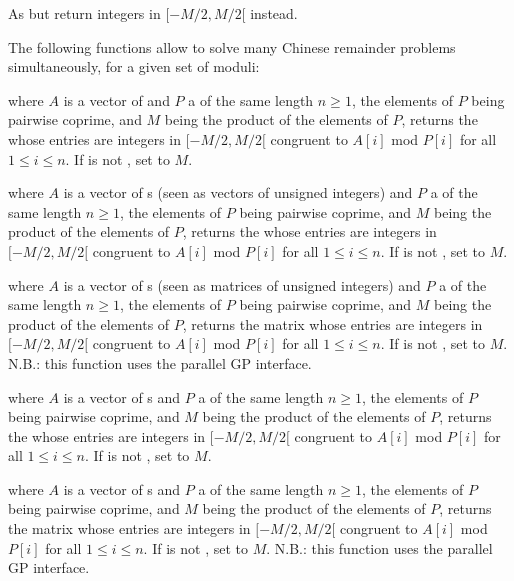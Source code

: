As  but return integers in $[-M/2, M/2[$ instead.

The following functions allow to solve many Chinese remainder problems
simultaneously, for a given set of moduli:

where $A$ is a vector of 
and $P$ a  of the same length $n\ge 1$, the elements of $P$
being pairwise coprime, and $M$ being the product of the elements of $P$,
returns the  whose entries are integers in $[-M/2, M/2[$ congruent to $A[i]$
mod $P[i]$ for all $1\leq i\leq n$.
If  is not , set  to $M$.

 where $A$ is a
vector of s (seen as vectors of unsigned integers) and $P$ a
 of the same length $n\ge 1$, the elements of $P$ being
pairwise coprime, and $M$ being the product of the elements of $P$, returns
the  whose entries are integers in $[-M/2, M/2[$ congruent to $A[i]$
mod $P[i]$ for all $1\leq i\leq n$. If  is not , set
 to $M$.

 where $A$ is a
vector of s (seen as matrices of unsigned integers) and $P$ a
 of the same length $n\ge 1$, the elements of $P$ being
pairwise coprime, and $M$ being the product of the elements of $P$, returns
the matrix whose entries are integers in $[-M/2, M/2[$ congruent to $A[i]$
mod $P[i]$ for all $1\leq i\leq n$. If  is not , set
 to $M$. N.B.: this function uses the parallel GP interface.

 where $A$ is a
vector of s and $P$ a
 of the same length $n\ge 1$, the elements of $P$ being
pairwise coprime, and $M$ being the product of the elements of $P$, returns
the  whose entries are integers in $[-M/2, M/2[$ congruent to $A[i]$
mod $P[i]$ for all $1\leq i\leq n$. If  is not , set
 to $M$.

 where $A$ is a
vector of s and $P$ a
 of the same length $n\ge 1$, the elements of $P$ being
pairwise coprime, and $M$ being the product of the elements of $P$, returns
the matrix whose entries are integers in $[-M/2, M/2[$ congruent to $A[i]$
mod $P[i]$ for all $1\leq i\leq n$. If  is not , set
 to $M$. N.B.: this function uses the parallel GP interface.

